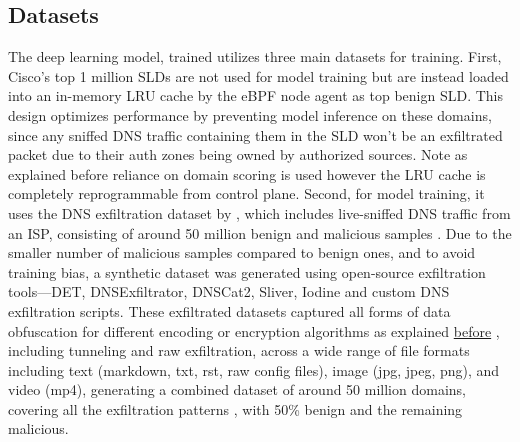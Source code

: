 \documentclass [11pt, proquest] {uwthesis}[2020/02/24]
\begin{document}
\subsection{Datasets}
\label{sec:dataset}
The deep learning model, trained utilizes three main datasets for training. First, Cisco’s top 1 million SLDs are not used for model training but are instead loaded into an in-memory LRU cache by the eBPF node agent as top benign SLD. This design optimizes performance by preventing model inference on these domains, since any sniffed DNS traffic containing them in the SLD won’t be an exfiltrated packet due to their auth zones being owned by authorized sources. Note as explained before reliance on domain scoring is used however the LRU cache is completely reprogrammable from control plane. Second, for model training, it uses the DNS exfiltration dataset by \citeauthor{ziza2023dns}, which includes live-sniffed DNS traffic from an ISP, consisting of around 50 million benign and malicious samples \cite{ziza2023dns}. Due to the smaller number of malicious samples compared to benign ones, and to avoid training bias, a synthetic dataset was generated using open-source exfiltration tools—DET, DNSExfiltrator, DNSCat2, Sliver, Iodine and custom DNS exfiltration scripts. These exfiltrated datasets captured all forms of data obfuscation for different encoding or encryption algorithms as explained  \hyperref[dns_payload_obfuscation]{before} , including tunneling and raw exfiltration, across a wide range of file formats including text (markdown, txt, rst, raw config files), image (jpg, jpeg, png), and video (mp4), generating a combined dataset of around 50 million domains, covering all the exfiltration patterns , with 50\% benign and the remaining malicious.


\begin{table}[ht]
\centering
{}
\caption{DNS Features in Kernel Space}
\label{sec:feature-kernel}
\end{table}
\end{document}
